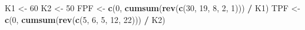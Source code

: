 \documentclass[
]{book}
\newenvironment{Shaded}{\begin{snugshade}}{\end{snugshade}}
\newcommand{\DecValTok}[1]{\textcolor[rgb]{0.00,0.00,0.81}{#1}}
\newcommand{\KeywordTok}[1]{\textcolor[rgb]{0.13,0.29,0.53}{\textbf{#1}}}
\newcommand{\NormalTok}[1]{#1}
\newcommand{\OperatorTok}[1]{\textcolor[rgb]{0.81,0.36,0.00}{\textbf{#1}}}
\newcommand{\StringTok}[1]{\textcolor[rgb]{0.31,0.60,0.02}{#1}}
\begin{document}
\begin{Shaded}
\begin{Highlighting}[]
\NormalTok{K1 <-}\StringTok{ }\DecValTok{60}
\NormalTok{K2 <-}\StringTok{ }\DecValTok{50}
\NormalTok{FPF <-}\StringTok{ }\KeywordTok{c}\NormalTok{(}\DecValTok{0}\NormalTok{, }\KeywordTok{cumsum}\NormalTok{(}\KeywordTok{rev}\NormalTok{(}\KeywordTok{c}\NormalTok{(}\DecValTok{30}\NormalTok{, }\DecValTok{19}\NormalTok{, }\DecValTok{8}\NormalTok{, }\DecValTok{2}\NormalTok{, }\DecValTok{1}\NormalTok{))) }\OperatorTok{/}\StringTok{ }\NormalTok{K1)}
\NormalTok{TPF <-}\StringTok{ }\KeywordTok{c}\NormalTok{(}\DecValTok{0}\NormalTok{, }\KeywordTok{cumsum}\NormalTok{(}\KeywordTok{rev}\NormalTok{(}\KeywordTok{c}\NormalTok{(}\DecValTok{5}\NormalTok{, }\DecValTok{6}\NormalTok{, }\DecValTok{5}\NormalTok{, }\DecValTok{12}\NormalTok{, }\DecValTok{22}\NormalTok{))) }\OperatorTok{/}\StringTok{ }\NormalTok{K2)}


\end{Highlighting}
\end{Shaded}
\end{document}
